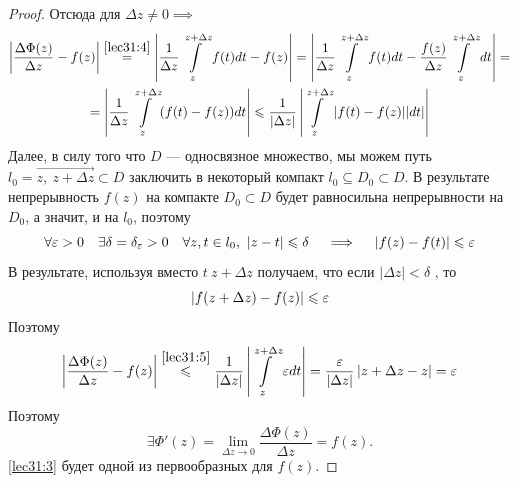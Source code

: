 \documentclass[../../main.tex]{subfiles}
\begin{document}
\begin{proof}
	Отсюда для $ \Delta z \neq 0 \implies $	
	\begin{equation}
	\begin{gathered}
		\label{lec31:5}
		\left| \dfrac{\Delta \Phi(z)}{\Delta z} - f(z) \right|
		\stackrel{ \eqref{lec31:4} }{=} \left|
		\dfrac{1}{\Delta z} \int\limits_{z}^{z + \Delta z} f(t) dt - f(z)
		\right| = \left|
		\dfrac{1}{\Delta z} \int\limits_{z}^{z + \Delta z} f(t) dt - 
		\dfrac{f(z)}{\Delta z} \int\limits_{z}^{z + \Delta z} dt
		\right| = \\
		= \left| \dfrac{1}{\Delta z} \int\limits_{z}^{z + \Delta z}
		(f(t) - f(z) ) dt \right| \le
		\dfrac{1}{ | \Delta z | } \left| \int\limits_{z}^{z + \Delta z}
		| f(t) - f(z) | | dt | \right| 
	\end{gathered}	
	\end{equation}
	Далее, в силу того что $D$ --- односвязное множество, мы можем путь
	$ l_0 = \overrightarrow{z, \ z + \Delta z} \subset D$ заключить в 
	некоторый компакт $ l_0 \subseteq D_0 \subset D$. В результате
	непрерывность $f(z)$ на компакте $D_0 \subset D$ будет равносильна
	непрерывности на $D_0$, а значит, и на $l_0$, поэтому
	\[ \forall \varepsilon > 0 \ \ \ \exists \delta = \delta_\varepsilon
	> 0 \ \ \ \forall z, t \in l_0 , \ |z - t| \leqslant \delta
	\ \ \ \implies \ \ \ |f(z) - f(t)| \leqslant \varepsilon \]
	В результате, используя вместо $ t \ z + \Delta z $ получаем, что
	если $| \Delta z| < \delta$ , то
	\[ | f(z + \Delta z ) - f(z) | \leqslant \varepsilon \]
	Поэтому
	\[ \left| \dfrac{\Delta \Phi(z)}{\Delta z} - f(z) \right|
	\stackrel{ \eqref{lec31:5} }{\leqslant}
	\dfrac{1}{ | \Delta z | } \left| \int\limits_{z}^{z + \Delta z}
	\varepsilon dt \right| = 
	\dfrac{\varepsilon}{ | \Delta z | } \left| z + \Delta
	z - z \right| = \varepsilon\]
	Поэтому
	\[ \exists \Phi ' (z) = \lim\limits_{\Delta z \to 0}
	\dfrac{\Delta \Phi(z)}{\Delta z} = f(z). \]	
	\eqref{lec31:3} будет одной из первообразных для $f(z)$.
\end{proof}
\end{document}
